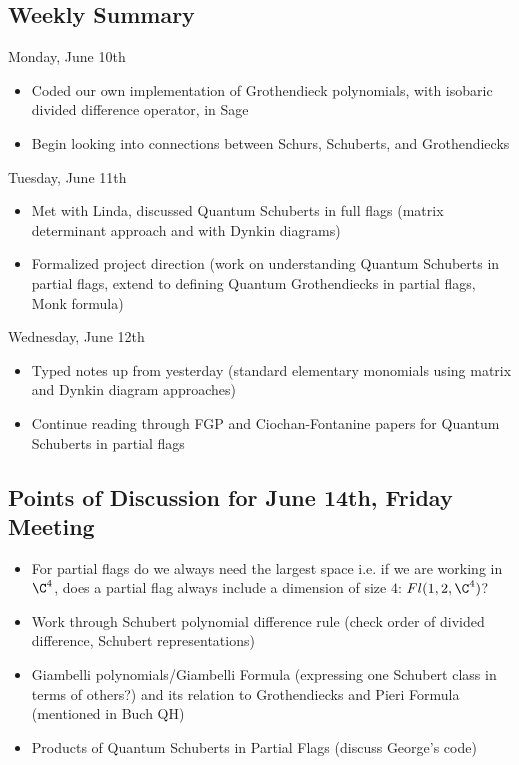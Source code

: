 \subsection{Weekly Summary}

Monday, June 10th
\begin{itemize}
    \item Coded our own implementation of Grothendieck polynomials, with isobaric divided difference operator, in Sage
    \item Begin looking into connections between Schurs, Schuberts, and Grothendiecks
\end{itemize}

Tuesday, June 11th
\begin{itemize}
    \item Met with Linda, discussed Quantum Schuberts in full flags (matrix determinant approach and with Dynkin diagrams)
    \item Formalized project direction (work on understanding Quantum Schuberts in partial flags, extend to defining Quantum Grothendiecks in partial flags, Monk formula)
\end{itemize}

Wednesday, June 12th
\begin{itemize}
    \item Typed notes up from yesterday (standard elementary monomials using matrix and Dynkin diagram approaches)
    \item Continue reading through FGP and Ciochan-Fontanine papers for Quantum Schuberts in partial flags
\end{itemize}

\subsection{Points of Discussion for June 14th, Friday Meeting}

\begin{itemize}
    \item For partial flags do we always need the largest space i.e. if we are working in $\C^4$, does a partial flag always include a dimension of size $4$: $Fl(1, 2, \C^4)$?
    \item Work through Schubert polynomial difference rule (check order of divided difference, Schubert representations)
    \item Giambelli polynomials/Giambelli Formula (expressing one Schubert class in terms of others?) and its relation to Grothendiecks and Pieri Formula (mentioned in Buch QH)
    \item Products of Quantum Schuberts in Partial Flags (discuss George's code)

\end{itemize}

